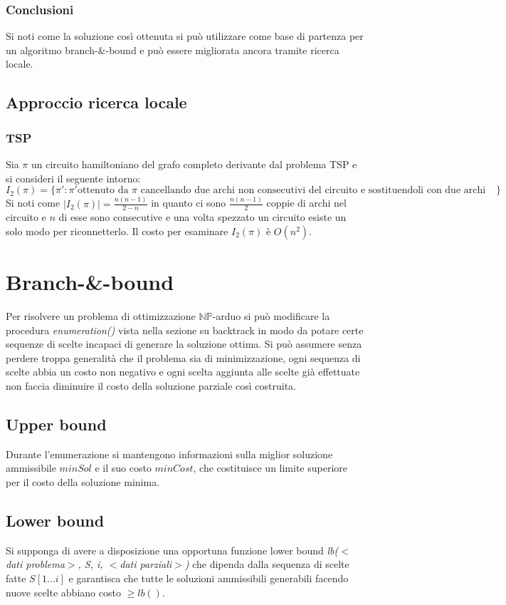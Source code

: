 \subsubsection{Conclusioni}
Si noti come la soluzione cos\`i ottenuta si pu\`o utilizzare come base di partenza per un algoritmo branch-\&-bound e pu\`o essere migliorata ancora tramite ricerca locale. 
\subsection{Approccio ricerca locale}
\subsubsection{TSP}
Sia $\pi$ un circuito hamiltoniano del grafo completo derivante dal problema TSP e si consideri il seguente intorno:
$$I_2(\pi) = \{\pi': \pi' \text{ottenuto da } \pi\text{ cancellando due archi non consecutivi del circuito e sostituendoli con due archi esterni al circuito}\}$$
Si noti come $|I_2(\pi)| = \frac{n(n-1)}{2-n}$ in quanto ci sono $\frac{n(n-1)}{2}$ coppie di archi nel circuito e $n$ di esse sono consecutive e una volta spezzato un circuito esiste
un solo modo per riconnetterlo. Il costo per esaminare $I_2(\pi)$ \`e $O(n^2)$. 
\section{Branch-\&-bound}
Per risolvere un problema di ottimizzazione $\mathbb{NP}$-arduo si pu\`o modificare la procedura \emph{enumeration()} vista nella sezione su backtrack in modo da potare certe sequenze
di scelte incapaci di generare la soluzione ottima. Si pu\`o assumere senza perdere troppa generalit\`a che il problema sia di minimizzazione, ogni sequenza di scelte abbia un costo non
negativo e ogni scelta aggiunta alle scelte gi\`a effettuate non faccia diminuire il costo della soluzione parziale cos\`i costruita. 
\subsection{Upper bound}
Durante l'enumerazione si mantengono informazioni sulla miglior soluzione ammissibile $minSol$ e il suo costo $minCost$, che costituisce un limite superiore per il costo della soluzione
minima. 
\subsection{Lower bound}
Si supponga di avere a disposizione una opportuna funzione lower bound \emph{lb($<$dati problema$>$, S, i, $<$dati parziali$>$)} che dipenda dalla sequenza di scelte fatte $S[1\dots i]$
e garantisca che tutte le soluzioni ammissibili generabili facendo nuove scelte abbiano costo $\ge lb()$.

